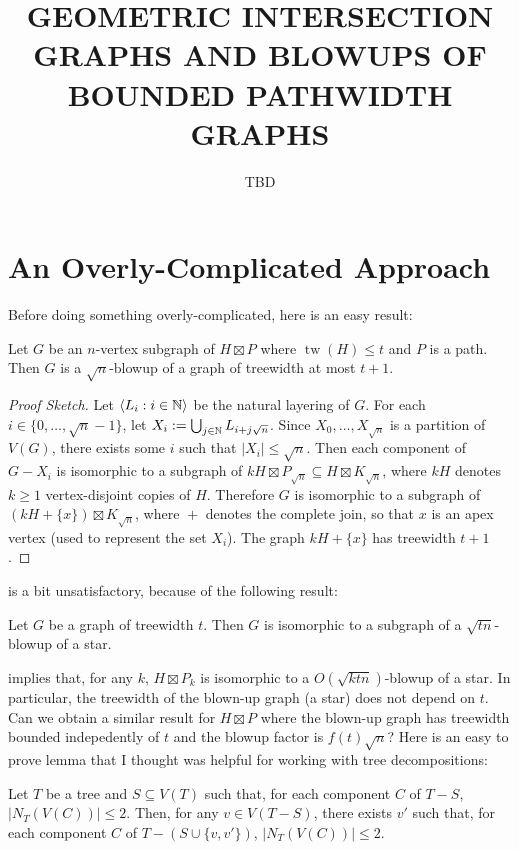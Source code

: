 \documentclass{patmorin}
\title{\MakeUppercase{\boldmath Geometric Intersection Graphs and Blowups of Bounded Pathwidth Graphs}}
\author{TBD}
\date{}
\renewcommand{\ge}{\geqslant}
\renewcommand{\le}{\leqslant}
\DeclareMathOperator{\tw}{tw}
\begin{document}
\maketitle

\section{An Overly-Complicated Approach}


Before doing something overly-complicated, here is an easy result:

\begin{thm}\label{easy}
  Let $G$ be an $n$-vertex subgraph of $H\boxtimes P$ where $\tw(H)\le t$ and $P$ is a path.  Then $G$ is a $\sqrt{n}$-blowup of a graph of treewidth at most $t+1$.
\end{thm}

\begin{proof}[Proof Sketch]
  Let $\langle L_i:i\in\mathbb{N}\rangle$ be the natural layering of $G$.  For each $i\in\{0,\ldots,\sqrt{n}-1\}$, let $X_i:=\bigcup_{j\in\mathbb{N}}L_{i+j\sqrt{n}}$.  Since $X_0,\ldots,X_{\sqrt{n}}$ is a partition of $V(G)$, there exists some $i$ such that $|X_i|\le\sqrt{n}$.  Then each component of $G-X_i$ is isomorphic to a subgraph of $kH\boxtimes P_{\sqrt{n}}\subseteq H\boxtimes K_{\sqrt{n}}$, where $kH$ denotes $k\ge 1$ vertex-disjoint copies of $H$. Therefore $G$ is isomorphic to a subgraph of $(kH+\{x\})\boxtimes K_{\sqrt{n}}$, where ${}+{}$ denotes the complete join, so that $x$ is an apex vertex (used to represent the set $X_i$). The graph $kH+\{x\}$ has treewidth $t+1$.
\end{proof}


 is a bit unsatisfactory, because of the following result:
\begin{thm}\label{star_partition}
  Let $G$ be a graph of treewidth $t$.  Then $G$ is isomorphic to a subgraph of a $\sqrt{tn}$-blowup of a star.
\end{thm}

 implies that, for any $k$, $H\boxtimes P_k$ is isomorphic to a $O(\sqrt{ktn})$-blowup of a star.  In particular, the treewidth of the blown-up graph (a star) does not depend on $t$.  Can we obtain a similar result for $H\boxtimes P$ where the blown-up graph has treewidth bounded indepedently of $t$ and the blowup factor is $f(t)\sqrt{n}$?  Here is an easy to prove lemma that I thought was helpful for working with tree decompositions:

\begin{lem}\label{tree_boundary}
  Let $T$ be a tree and $S\subseteq V(T)$ such that, for each component $C$ of $T-S$, $|N_T(V(C))|\le 2$.  Then, for any $v\in V(T-S)$, there exists $v'$ such that, for each component $C$ of $T-(S\cup\{v,v'\})$, $|N_T(V(C))|\le 2$.
\end{lem}
\end{document}
